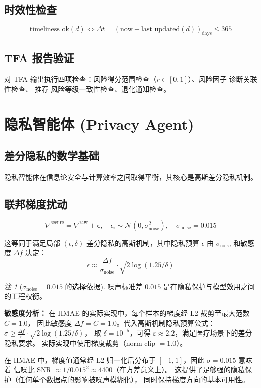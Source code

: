 \documentclass[11pt,a4paper]{ctexart}
\theoremstyle{remark}
\newtheorem{remark}{注}[section]
\begin{document}
\subsection{时效性检查}

\begin{equation}
\text{timeliness\_ok}(d) \iff \Delta t = (\text{now} - \text{last\_updated}(d))_{\text{days}} \leq 365
\end{equation}

\subsection{TFA 报告验证}

对 TFA 输出执行四项检查：风险得分范围检查（$r \in [0,1]$）、风险因子-诊断关联性检查、
推荐-风险等级一致性检查、退化通知检查。

\section{隐私智能体 (Privacy Agent)}

\subsection{差分隐私的数学基础}

隐私智能体在信息论安全与计算效率之间取得平衡，其核心是高斯差分隐私机制。

\subsection{联邦梯度扰动}

\begin{equation}
\nabla^{\text{secure}} = \nabla^{\text{raw}} + \boldsymbol{\epsilon}, \quad \epsilon_i \sim \mathcal{N}(0, \sigma_{\text{noise}}^2), \quad \sigma_{\text{noise}} = 0.015
\end{equation}

这等同于满足局部 $(\epsilon, \delta)$-差分隐私的高斯机制，其中隐私预算 $\epsilon$ 由 $\sigma_{\text{noise}}$ 和敏感度 $\Delta f$ 决定：
\begin{equation}
\epsilon \approx \frac{\Delta f}{\sigma_{\text{noise}}} \cdot \sqrt{2\log(1.25/\delta)}
\end{equation}

\begin{remark}[$\sigma_{\text{noise}} = 0.015$ 的选择依据]
噪声标准差 $0.015$ 是在隐私保护与模型效用之间的工程权衡。

\textbf{敏感度分析：} 在 HMAE 的实际实现中，每个样本的梯度经 L2 裁剪至最大范数 $C = 1.0$，
因此敏感度 $\Delta f = C = 1.0$。代入高斯机制隐私预算公式：
$\sigma \geq \frac{\Delta f}{\varepsilon} \cdot \sqrt{2\log(1.25/\delta)}$，
取 $\delta = 10^{-5}$，可得 $\varepsilon \approx 2.2$，满足医疗场景下的差分隐私要求。
实际实现中使用梯度裁剪（norm clip $= 1.0$）。

在 HMAE 中，梯度值通常经 L2 归一化后分布于 $[-1, 1]$，因此 $\sigma = 0.015$ 意味着
信噪比 SNR $\approx 1/0.015^2 \approx 4400$（在方差意义上）。
这提供了足够强的隐私保护（任何单个数据点的影响被噪声模糊化），
同时保持梯度方向的基本可用性。
\end{remark}
\end{document}
